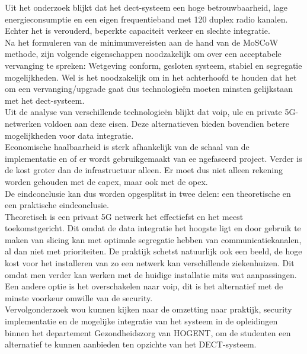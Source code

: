 Uit het onderzoek blijkt dat het \gls{dect}-systeem een  hoge betrouwbaarheid, lage energieconsumptie en een eigen frequentieband met 120 duplex radio kanalen. Echter het is verouderd,  beperkte capaciteit verkeer en slechte integratie. \\

Na het formuleren van de minimumvereisten aan de hand van de MoSCoW methode, zijn volgende eigenschappen noodzakelijk om over een acceptabele vervanging te spreken: Wetgeving conform, gesloten systeem, stabiel en segregatie mogelijkheden. Wel is het noodzakelijk om in het achterhoofd te houden dat het om een vervanging/upgrade gaat dus technologieën moeten minsten gelijkstaan met het \gls{dect}-systeem.\\
Uit de analyse van verschillende technologieën blijkt dat \gls{voip}, \gls{ule} en private 5G-netwerken voldoen aan deze eisen. Deze alternatieven bieden bovendien betere mogelijkheden voor data integratie.\\
Economische haalbaarheid is sterk afhankelijk van de schaal van de implementatie en of er wordt gebruikgemaakt van ee ngefaseerd project. Verder is de kost groter dan de infrastructuur alleen. Er moet dus niet alleen rekening worden gehouden met de \gls{capex}, maar ook met de \gls{opex}.\\

De eindconclusie kan dus worden opgesplitst in twee delen: een theoretische en een praktische eindconclusie.\\
Theoretisch is een privaat 5G netwerk het effectiefst en het meest toekomstgericht. Dit omdat de data integratie het hoogste ligt en door gebruik te maken van slicing kan met optimale segregatie hebben van communicatiekanalen, al dan niet met prioriteiten. De praktijk schetst natuurlijk ook een beeld, de hoge kost voor het installeren van zo een netwerk kan verschillende ziekenhuizen. Dit omdat men verder kan werken met de huidige installatie mits wat aanpassingen. Een andere optie is het overschakelen naar \gls{voip}, dit is het alternatief met de minste voorkeur omwille van de security.\\

Vervolgonderzoek wou kunnen kijken naar de omzetting naar praktijk, security implementatie en de mogelijke integratie van het systeem in de opleidingen binnen het departement Gezondheidszorg van HOGENT, om de studenten een alternatief te kunnen aanbieden ten opzichte van het DECT-systeem.



